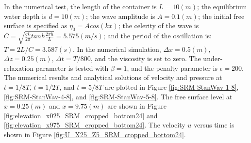 In the numerical test, the length of the container is $L=10(m)$;
the equilibrium water depth is $d=10(m)$; the wave amplitude is
$A=0.1(m)$; the initial free surface is specified as $\eta_0 = A
cos(kx)$; the celerity of the wave is $C= \sqrt{\frac{gL}{2
\pi}tanh \frac{2 \pi h}{L}}=5.575 (m/s)$; and the period of the
oscillation is: $ T=2L/C= 3.587 (s)$. In the numerical simulation, $\Delta x = 0.5 (m)$, $\Delta z = 0.25 (m)$, $\Delta t = T/800$, and the viscosity is set to zero. The under-relaxation parameter is tested with $\beta=1$, and the penalty parameter is $\epsilon=200$.
The numerical results and analytical solutions of velocity and pressure at $t=1/8T$, $t=1/2T$, and $t=5/8T$ are plotted in Figure \ref{fig:SRM-StanWav-1-8}, \ref{fig:SRM-StanWav-4-8}, and \ref{fig:SRM-StanWav-5-8}. The free surface level at $x=0.25(m)$ and $x=9.75(m)$ are shown in Figure \ref{fig:elevation_x025_SRM_cropped_bottom24} and \ref{fig:elevation_x975_SRM_cropped_bottom24}. The velocity $u$ versus time is shown in Figure \ref{fig:U_X25_Z5_SRM_cropped_bottom24}.

